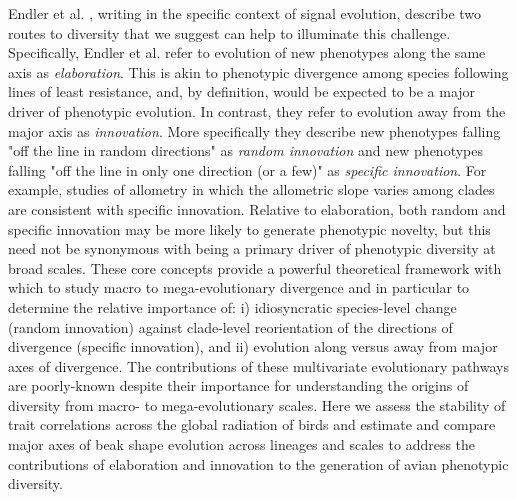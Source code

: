 \documentclass[12pt,letterpaper]{article}
\begin{document}
 Endler et al. \cite{endler2005animal}, writing in the specific context of signal evolution, describe two  routes to diversity that we suggest can help to illuminate this challenge. Specifically, Endler et al. refer to evolution of new phenotypes along the same axis as \textit{elaboration}. This is akin to phenotypic divergence among species following lines of least resistance, and, by definition, would be expected to be a major driver of phenotypic evolution. In contrast, they refer to evolution away from the major axis as \textit{innovation}. More specifically they describe new phenotypes falling "off the line in random directions" as \textit{random innovation} and new phenotypes falling "off the line in only one direction (or a few)" as \textit{specific innovation}.  For example, studies of allometry in which the allometric slope varies among clades \cite{marroig2005size,Rombaut2022} are consistent with specific innovation. Relative to elaboration, both random and specific innovation may be more likely to generate phenotypic novelty, but this need not be synonymous with being a primary driver of phenotypic diversity at broad scales. These core concepts provide a powerful theoretical framework with which to study macro to mega-evolutionary divergence and in particular to determine the relative importance of: i) idiosyncratic species-level change (random innovation) against clade-level reorientation of the directions of divergence (specific innovation), and ii) evolution along versus away from major axes of divergence. The contributions of these multivariate evolutionary pathways are poorly-known despite their importance for understanding the origins of diversity from macro- to mega-evolutionary scales. 
 Here we assess the stability of trait correlations across the global radiation of birds and estimate and compare major axes of beak shape evolution across lineages and scales to address the contributions of elaboration and innovation to the generation of avian phenotypic diversity.
 

\end{document}
